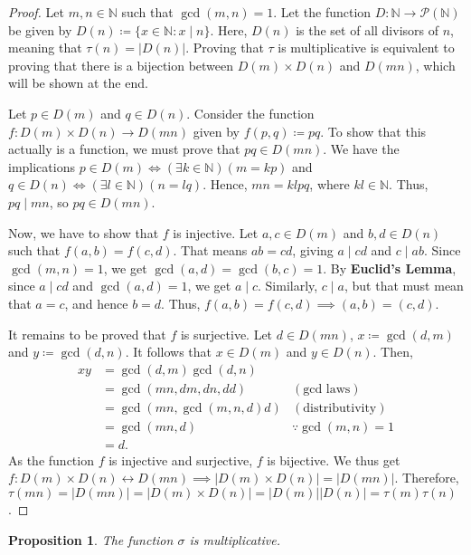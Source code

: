 \documentclass[a4paper]{article}
\newtheorem{proposition}[theorem]{Proposition}
\theoremstyle{definition}
\begin{document}
\begin{proof}
    Let $m,n \in \mathbb{N}$ such that $\gcd(m,n) = 1$.
    Let the function $D\colon \mathbb{N} \to \mathcal{P}(\mathbb{N})$ be given by $D(n) \coloneq \{x \in \mathbb{N} : x \mid n\}$. Here, $D(n)$ is the set of all divisors of $n$, meaning that $\tau(n) = |D(n)|$.
    Proving that $\tau$ is multiplicative is equivalent to proving that there is a bijection between $D(m) \times D(n)$ and $D(mn)$, which will be shown at the end.

    Let $p \in D(m)$ and $q \in D(n)$.
    Consider the function $f\colon D(m) \times D(n) \to D(mn)$ given by $f(p,q) \coloneq pq$.
    To show that this actually is a function, we must prove that $pq \in D(mn)$.
    We have the implications $p \in D(m) \iff (\exists k \in \mathbb{N})(m = kp)$ and $q \in D(n) \iff (\exists l \in \mathbb{N})(n = lq)$.
    Hence, $mn = klpq$, where $kl \in \mathbb{N}$.
    Thus, $pq \mid mn$, so $pq \in D(mn)$.

    Now, we have to show that $f$ is injective.
    Let $a,c \in D(m)$ and $b,d \in D(n)$ such that $f(a,b) = f(c,d)$.
    That means $ab = cd$, giving $a \mid cd$ and $c \mid ab$.
    Since $\gcd(m,n) = 1$, we get $\gcd(a,d) = \gcd(b,c) = 1$.
    By \textbf{Euclid's Lemma}, since $a \mid cd$ and $\gcd(a,d)=1$, we get $a \mid c$.
    Similarly, $c \mid a$, but that must mean that $a=c$, and hence $b=d$.
    Thus, $f(a,b) = f(c,d) \implies (a,b) = (c,d)$.

    It remains to be proved that $f$ is surjective.
    Let $d \in D(mn)$, $x \coloneq \gcd(d,m)$ and $y \coloneq \gcd(d,n)$.
    It follows that $x \in D(m)$ and $y \in D(n)$.
    Then,
    \begin{align*}
        xy & = \gcd(d,m) \gcd(d,n)                              \\
           & = \gcd(mn, dm, dn, dd)   & (\text{gcd laws})       \\
           & = \gcd(mn, \gcd(m,n,d)d) & (\text{distributivity}) \\
           & = \gcd(mn, d)            & \because \gcd (m,n)=1   \\
           & = d.
    \end{align*}
    As the function $f$ is injective and surjective, $f$ is bijective.
    We thus get $f\colon D(m) \allowbreak \times D(n) \leftrightarrow D(mn) \implies |D(m) \times D(n)| = |D(mn)|$.
    Therefore, $\tau(mn) = |D(mn)| = |D(m) \times D(n)| = |D(m)||D(n)| = \tau(m)\tau(n)$.
\end{proof}
\begin{proposition}
    The function $\sigma$ is multiplicative.
\end{proposition}
\end{document}
